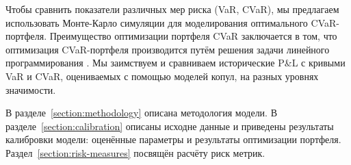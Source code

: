 Чтобы сравнить показатели различных мер риска (VaR, CVaR), мы предлагаем использовать Монте-Карло симуляции для моделирования оптимального CVaR-портфеля.
Преимущество оптимизации портфеля CVaR заключается в том, что оптимизация CVaR-портфеля производится путём решения задачи линейного программирования \cite{Rock2000}.
Мы заимствуем и сравниваем исторические P\&L с кривыми VaR и CVaR, оцениваемых с помощью моделей копул, на разных уровнях значимости.

В разделе~\ref{section:methodology} описана методология модели. 
В разделе~\ref{section:calibration} описаны исходне данные и приведены результаты калибровки модели: оценённые параметры и результаты оптимизации портфеля. 
Раздел~\ref{section:risk-measures} посвящён расчёту риск метрик.